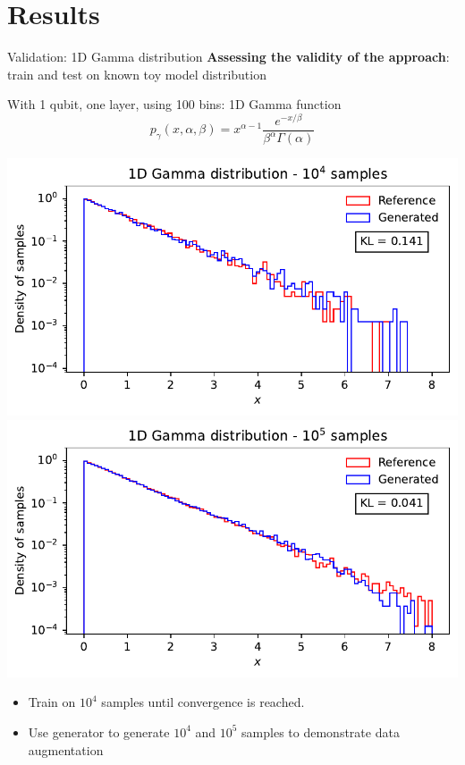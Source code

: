 \documentclass[11pt,aspectratio=169]{beamer}
\begin{document}
\section{Results}

\begin{frame}{Validation: 1D Gamma distribution}
    \textbf{Assessing the validity of the approach}: train and test on known toy model distribution
    
    With 1 qubit, one layer, using 100 bins: 1D Gamma function
    $$ p_\gamma (x, \alpha, \beta) = x^{\alpha-1} \frac{e^{-x/\beta}}{\beta^\alpha \Gamma (\alpha)}$$
    \begin{multicols*}{2}
        \includegraphics[width=0.5 \textwidth]{figures/plots/1Dgamma/1Dgamma_distribution_10k.pdf}
        \includegraphics[width=0.5 \textwidth]{figures/plots/1Dgamma/1Dgamma_distribution_100k.pdf}
    \end{multicols*}
    \begin{itemize}
        \item Train on $10^4$ samples until convergence is reached.
        \item Use generator to generate $10^4$ and $10^5$ samples to demonstrate data augmentation
    \end{itemize}
\end{frame}
\end{document}
